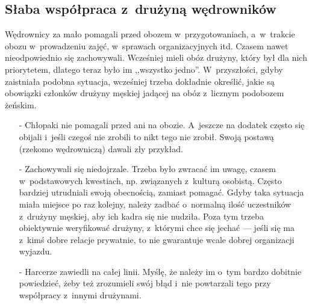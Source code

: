 \subsection{Słaba współpraca z~drużyną wędrowników}
Wędrownicy za mało pomagali przed obozem w~przygotowaniach, a~w~trakcie obozu w~prowadzeniu zajęć, w~sprawach organizacyjnych itd. Czasem nawet nieodpowiednio się zachowywali. Wcześniej mieli obóz drużyny, który był dla nich priorytetem, dlatego teraz było im ,,wszystko jedno''. W~przyszłości, gdyby zaistniała podobna sytuacja, wcześniej trzeba dokładnie określić, jakie są obowiązki członków drużyny męskiej jadącej na obóz z~licznym podobozem żeńskim.
\begin{itemize}
\item[-] Chłopaki nie pomagali przed ani na obozie. A~jeszcze na dodatek często się obijali i~jeśli czegoś nie zrobili to nikt tego nie zrobił. Swoją postawą (rzekomo wędrowniczą) dawali zły przykład.
\item[-] Zachowywali się niedojrzale. Trzeba było zwracać im uwagę, czasem w~podstawowych kwestiach, np. związanych z~kulturą osobistą. Często bardziej utrudniali swoją obecnością, zamiast pomagać. Gdyby taka sytuacja miała miejsce po raz kolejny, należy zadbać o~normalną ilość uczestników z~drużyny męskiej, aby ich kadra się nie nudziła. Poza tym trzeba obiektywnie weryfikować drużyny, z~którymi chce się jechać --- jeśli się ma z~kimś dobre relacje prywatnie, to nie gwarantuje wcale dobrej organizacji wyjazdu.
\item[-] Harcerze zawiedli na całej linii. Myślę, że należy im o~tym bardzo dobitnie powiedzieć, żeby też zrozumieli swój błąd i~nie powtarzali tego przy współpracy z~innymi drużynami.
\end{itemize}
